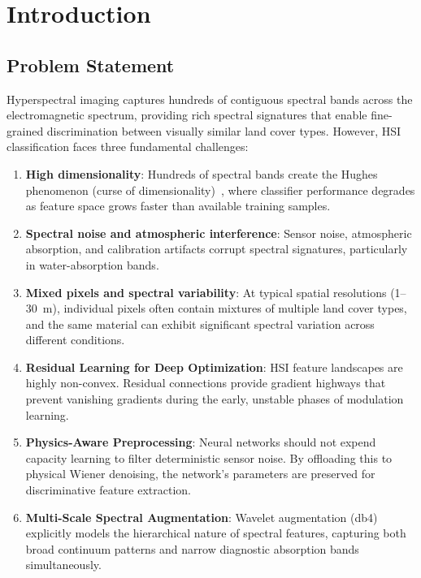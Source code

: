 \documentclass[conference]{IEEEtran}
\begin{document}
\section{Introduction}

\subsection{Problem Statement}

Hyperspectral imaging captures hundreds of contiguous spectral bands across the electromagnetic spectrum, providing rich spectral signatures that enable fine-grained discrimination between visually similar land cover types. However, HSI classification faces three fundamental challenges:

\begin{enumerate}
\item \textbf{High dimensionality}: Hundreds of spectral bands create the Hughes phenomenon (curse of dimensionality)~\cite{hughes1968mean}, where classifier performance degrades as feature space grows faster than available training samples.
\item \textbf{Spectral noise and atmospheric interference}: Sensor noise, atmospheric absorption, and calibration artifacts corrupt spectral signatures, particularly in water-absorption bands.
\item \textbf{Mixed pixels and spectral variability}: At typical spatial resolutions (1--30~m), individual pixels often contain mixtures of multiple land cover types, and the same material can exhibit significant spectral variation across different conditions.
    \item \textbf{Residual Learning for Deep Optimization}: HSI feature landscapes are highly non-convex. Residual connections provide gradient highways that prevent vanishing gradients during the early, unstable phases of modulation learning.
    \item \textbf{Physics-Aware Preprocessing}: Neural networks should not expend capacity learning to filter deterministic sensor noise. By offloading this to physical Wiener denoising, the network's parameters are preserved for discriminative feature extraction.
    \item \textbf{Multi-Scale Spectral Augmentation}: Wavelet augmentation (db4) explicitly models the hierarchical nature of spectral features, capturing both broad continuum patterns and narrow diagnostic absorption bands simultaneously.
\end{enumerate}
\end{document}
